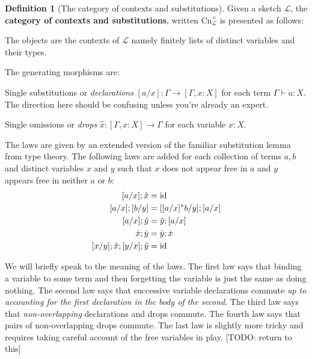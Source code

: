 \documentclass[12pt,twoside]{reedthesis}
\theoremstyle{definition}
\newtheorem{definition}{Definition}
\theoremstyle{remark}
\theoremstyle{plain}
\begin{document}
\begin{definition}[The category of contexts and substitutions]\label{def:syn cat}
  Given a sketch $\mathcal{L}$, the \textbf{category of contexts and substitutions}, written \( \text{Cn}^{\times}_{\mathcal{L}}\) is presented as follows:
  \begin{outline}
    \1 The objects are the contexts of \( \mathcal{L} \) namely finitely lists
    of distinct variables and their types.

    \1 The generating morphisms are:

      \2 Single substitutions or \emph{declarations} \( [a/x] : \Gamma \rightarrow [\Gamma, x:X] \) for each term
      \( \Gamma \vdash a : X \). The direction here should be confusing unless you're already an expert.

      \2 Single omissions or \emph{drops} \( \hat{x} : [\Gamma, x : X] \rightarrow \Gamma \) for
      each variable $x:X$.

    \1 The laws are given by an extended version of the familiar substitution
      lemma from type theory. The following laws are added for each collection
      of terms $a,b$ and distinct variables $x$ and $y$ such that $x$ does not
      appear free in $a$ and $y$ appears free in neither $a$ or $b$:
    \begin{align*}
      [a/x] ; \hat{x} &= \text{id} \\
      [a/x] ; [b/y]   &= [ [ a/x ]^{*} b/y ] ; [a/x] \\
      [a/x]; \hat{y} &= \hat{y}; [a/x] \\
      \hat{x}; \hat{y} &= \hat{y}; \hat{x} \\
      [x/y]; \hat{x}; [y/x]; \hat{y} &= \text{id}
    \end{align*}
  \end{outline}
  We will briefly speak to the meaning of the laws. The first law says that
  binding a variable to some term and then forgetting the variable is just the
  same as doing nothing. The second law says that successive variable
  declarations commute \emph{up to accounting for the first declaration in the
    body of the second}. The third law says that \emph{non-overlapping}
  declarations and drops commute. The fourth law says that pairs of
  non-overlapping drops commute. The last law is slightly more tricky and
  requires taking careful account of the free variables in play. [TODO: return
  to this] 
\end{definition}
\end{document}
